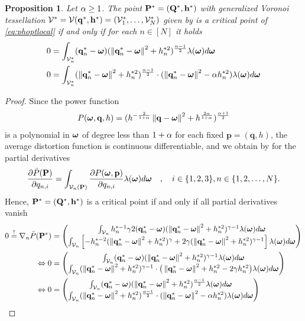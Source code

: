 \documentclass[smallabstract,smallcaptions]{dccpaper}
\newtheorem{prop}{Proposition}
\newif\ifproof\prooffalse %
\renewcommand{\vq}{\mathbf p}
\renewcommand{\vp}{\mathbf q}
\renewcommand{\vQ}{\mathbf P}
\renewcommand{\vP}{\mathbf Q}
\newcommand{\df}{\ensuremath{\lam}}         %
\newcommand{\Pbar}{\ensuremath{\bar{P}}}         %
\newcommand{\Vor}{\ensuremath{\mathcal{V}}}         %
\begin{document}
\begin{prop}\label{prop:necessarycond}
  Let $\alpha \geq 1$. The point $\vQ^*=(\vP^*,\vh^*)$ with generalized Voronoi tessellation
  $\Vor^*=\Vor(\vp^*,\vh^*)=(\Vor_1^*,\dots,\Vor^*_N)$ given by  is a critical point of
  \eqref{eq:phoptlocal} if  and only if for each $n\in[N]$ it holds
  \begin{align}
    0&= \int_{\Vor^*_n} (\vp^*_{n}-\vome) (\Norm{\vp^*_n-\vome}^2 +h_n^{*2})^{\frac{\alp-1}{2}} \df(\vome)d
    \vome\label{eq:pnopt}\\
    0&= \int_{\Vor^*_n} (\Norm{\vp^*_n-\vome}^2 +h_n^{*2})^{\frac{\alp-1}{2}}\cdot (\Norm{\vp_n^*-\vome}^2 - \alp
    h_n^{*2} ) \df(\vome)d\vome
  \label{eq:criticalpoint}
  \end{align}
\end{prop}
%
\ifproof
\begin{proof}
Since the power function 
%
\begin{align}
  P(\vome,\vp,h)= (h^{-\frac{2}{1+\alp}}\Norm{\vp-\vome}^2 + h^{\frac{2\alp}{1+\alp}})^{\frac{\alp+1}{2}}
\end{align}  
%
is a polynomial in $\boldsymbol{ \omega}$ of degree less than $1+\alpha$ for each fixed $\vq=(\vp,h)$, the average distortion function is continuous
differentiable, and we obtain by \cite[Thm.1]{WJ18} for the partial derivatives 
%
\begin{align}
  \frac{\partial \Pbar(\vQ)}{\partial q_{n,i}} = \int_{\Vor_n(\vQ)} \frac{\partial P(\vome,\vq)}{\partial q_{n,i}}
  \df(\vome)d\vome\quad,\quad i\in\{1,2,3\},n\in\{1,2,\dots,N\}.
\end{align}
%
Hence, $\vQ^*=(\vP^*,\vh^*)$ is a critical point if and only if all partial derivatives vanish 
%
\begin{align}
 0\overset{!}{=} \nabla_n \Pbar(\vQ^*) &= \begin{pmatrix} 
   \int_{\Vor_n} h_n^{*-1} \gam 2 (\vp^*_{n}-\vome)  (\Norm{\vp_n^*-\vome}^2 +h_n^{*2})^{\gam-1}  \df(\vome)d \vome\\
   \int_{\Vor_n} \left[-h_n^{*-2}(\Norm{\vp^*_n-\vome}^2 + h_n^{*2})^{\gam} + 2\gam (\Norm{\vp_n^*-\vome}^2 +h_n^{*2})^{\gam-1}\right]
    \df(\vome)d \vome
  \end{pmatrix} \notag\\
\LRA 0&= \begin{pmatrix}
  \int_{\Vor_n} (\vp^*_{n}-\vome) (\Norm{\vp^*_n-\vome}^2 +h_n^{*2})^{\gam-1} \df(\vome)d \vome\\
  \int_{\Vor_n} (\Norm{\vp^*_n-\vome}^2 +h_n^{*2})^{\gam-1}\cdot \big(\Norm{\vp^*_n-\vome}^2+h_n^{*2} - 2\gam h_n^{*2} \big)
  \df(\vome)d \vome
 \end{pmatrix}\notag\\
 \LRA 0&= \begin{pmatrix}
   \int_{\Vor_n} (\vp_{n}^*-\vome) (\Norm{\vp^*_n-\vome}^2 +h_n^{*2})^{\frac{\alp-1}{2}} \df(\vome)d \vome\\
   \int_{\Vor_n} (\Norm{\vp_n^*-\vome}^2 +h_n^{*2})^{\frac{\alp-1}{2}}\cdot (\Norm{\vp_n^*-\vome}^2 - \alp h_n^{*2} )
   \df(\vome)d \vome
  \end{pmatrix}\label{eq:graddph}
\end{align}
%
\end{proof}
\end{document}
